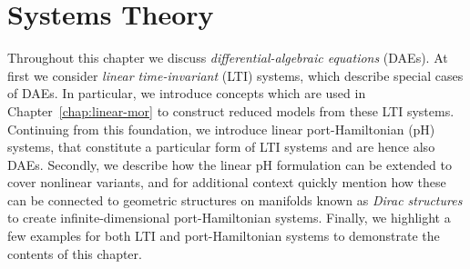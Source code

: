 \chapter{Systems Theory}\label{chap:systems-theory}

Throughout this chapter we discuss \emph{differential-algebraic equations} (DAEs).
At first we consider \emph{linear time-invariant} (LTI) systems, which describe special cases of DAEs.
In particular, we introduce concepts which are used in Chapter~\ref{chap:linear-mor} to construct reduced models from these LTI systems.
Continuing from this foundation, we introduce linear port-Hamiltonian (pH) systems, that constitute a particular form of LTI systems and are hence also DAEs.
Secondly, we describe how the linear pH formulation can be extended to cover nonlinear variants, and for additional context quickly mention how these can be connected to geometric structures on manifolds known as \emph{Dirac structures} to create infinite-dimensional port-Hamiltonian systems.
Finally, we highlight a few examples for both LTI and port-Hamiltonian systems to demonstrate the contents of this chapter.




